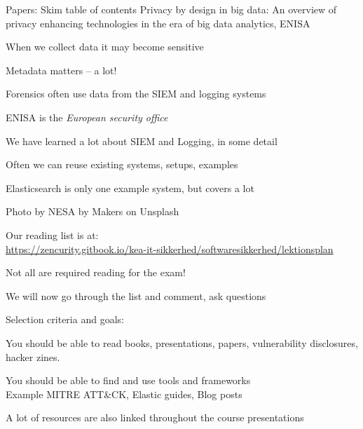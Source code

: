 \documentclass[Screen16to9,17pt]{foils}
\begin{document}

\begin{quote}

\end{quote}

\begin{list1}
\item Papers: Skim table of contents Privacy by design in big data: An overview of privacy enhancing technologies in the era of big data analytics, ENISA
\begin{list2}
\item When we collect data it may become sensitive
\item Metadata matters -- a lot!
\item Forensics often use data from the SIEM and logging systems
\item ENISA is the \emph{European security office}
\end{list2}
\end{list1}




\begin{list1}
\item We have learned a lot about SIEM and Logging, in some detail
\item Often we can reuse existing systems, setups, examples
\item Elasticsearch is only one example system, but covers a lot
\item Photo by NESA by Makers on Unsplash
\end{list1}



\begin{list1}
\item Our reading list is at:\\
{\footnotesize\url{https://zencurity.gitbook.io/kea-it-sikkerhed/softwaresikkerhed/lektionsplan}}
\item Not all are required reading for the exam!
\item We will now go through the list and comment, ask questions
\item Selection criteria and goals:
\begin{list2}
\item You should be able to read books, presentations, papers, vulnerability disclosures, hacker zines.
\item You should be able to find and use tools and frameworks\\
Example MITRE ATT\&CK, Elastic guides, Blog posts
\end{list2}
\item A lot of resources are also linked throughout the course presentations
\end{list1}
\end{document}
